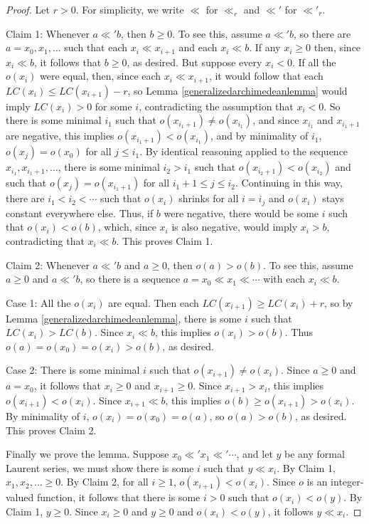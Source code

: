 \documentclass[twoside,11pt]{article}
\begin{document}
\begin{proof}
Let $r>0$. For simplicity, we write $\ll$ for $\ll_r$ and $\ll'$ for
$\ll'_r$.

Claim 1: Whenever $a\ll' b$, then $b\geq 0$.
To see this, assume $a\ll' b$, so there are $a=x_0,x_1,\ldots$ such that each
$x_i\ll x_{i+1}$ and each $x_i\ll b$.
If any $x_i\geq 0$ then, since $x_i\ll b$, it follows that $b\geq 0$, as desired.
But suppose every $x_i<0$.
If all the $o(x_i)$ were equal, then, since each
$x_i\ll x_{i+1}$, it would follow that each $LC(x_{i})\leq LC(x_{i+1})-r$, so Lemma
\ref{generalizedarchimedeanlemma} would imply $LC(x_i)>0$ for some $i$, contradicting
the assumption that $x_i<0$. So there is some minimal $i_1$ such
that $o(x_{i_1+1})\not=o(x_{i_1})$,
and since $x_{i_1}$ and $x_{i_1+1}$ are negative, this implies
$o(x_{i_1+1})<o(x_{i_1})$, and by minimality of $i_1$, $o(x_j)=o(x_0)$ for all
$j\leq i_1$.
By identical reasoning applied to the sequence $x_{i_1},x_{i_1+1},\ldots$,
there is some minimal $i_2>i_1$ such that $o(x_{i_2+1})<o(x_{i_2})$
and such that $o(x_j)=o(x_{i_1+1})$ for all $i_1+1\leq j\leq i_2$.
Continuing in this way, there are $i_1<i_2<\cdots$ such that $o(x_i)$ shrinks
for all $i=i_j$ and $o(x_i)$ stays constant everywhere else. Thus, if $b$ were negative,
there would be some $i$ such that $o(x_i)<o(b)$, which, since $x_i$ is also negative,
would imply $x_i>b$, contradicting that $x_i\ll b$. This proves Claim 1.

Claim 2: Whenever $a\ll' b$ and $a\geq 0$, then $o(a)>o(b)$.
To see this, assume $a\geq 0$ and $a\ll' b$, so there is a sequence
$a=x_0\ll x_1\ll\cdots$ with each $x_i\ll b$.

Case 1: All the $o(x_i)$ are equal. Then each $LC(x_{i+1})\geq LC(x_i)+r$, so by Lemma
\ref{generalizedarchimedeanlemma}, there is some $i$ such that $LC(x_i)>LC(b)$.
Since $x_i\ll b$, this implies $o(x_i)>o(b)$. Thus $o(a)=o(x_0)=o(x_i)>o(b)$, as desired.

Case 2: There is some minimal $i$ such that $o(x_{i+1})\not=o(x_{i})$.
Since $a\geq 0$ and $a=x_0$, it follows that $x_i\geq 0$ and $x_{i+1}\geq 0$. Since
$x_{i+1}>x_{i}$, this implies $o(x_{i+1})<o(x_{i})$.
Since $x_{i+1}\ll b$, this implies $o(b)\geq o(x_{i+1})>o(x_i)$.
By minimality of $i$, $o(x_i)=o(x_0)=o(a)$, so $o(a)>o(b)$, as desired. This proves Claim 2.

Finally we prove the lemma. Suppose $x_0\ll' x_1\ll' \cdots$, and let
$y$ be any formal Laurent series, we must show there is some $i$ such that
$y\ll x_i$. By Claim 1, $x_1,x_2,\ldots\geq 0$.
By Claim 2, for all $i\geq 1$, $o(x_{i+1})<o(x_i)$.
Since $o$ is an integer-valued function, it follows that there is some $i>0$
such that $o(x_i)<o(y)$. By Claim 1, $y\geq 0$. Since $x_i\geq 0$ and $y\geq 0$
and $o(x_i)<o(y)$, it follows $y\ll x_i$.
\end{proof}
\end{document}
